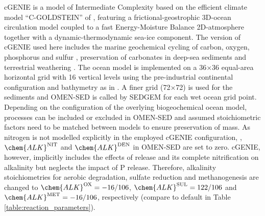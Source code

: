 \documentclass[gmd, manuscript]{copernicus}
\begin{document}
cGENIE is a model of Intermediate Complexity based on the efficient climate model ``C-GOLDSTEIN''  of \citet{edwards_uncertainties_2005}, featuring a frictional-geostrophic 3D-ocean circulation model coupled to a fast 
Energy-Moisture Balance 2D-atmosphere together with a dynamic-thermodynamic sea-ice component. 
The version of cGENIE used here includes the marine geochemical cycling of carbon, oxygen, phosphorus and sulfur \citep{ridgwell_marine_2007}, 
preservation of carbonates in deep-sea sediments \citep[SEDGEM,][]{ridgwell_regulation_2007} and terrestrial weathering \citep{colbourn_rock_2013}. 
The ocean model is implemented on a 36$\times$36 equal-area horizontal grid with 16 vertical levels using the pre-industrial continental configuration and bathymetry as in \citet{archer_atmospheric_2009}. 
A finer grid (72$\times$72) is used for the sediments \citep[see Fig. \ref{fig:TOC_Obs_regridded}C and ][]{ridgwell_regulation_2007} and OMEN-SED is called by SEDGEM for each wet ocean grid point. 
Depending on the configuration of the overlying biogeochemical ocean model, processes can be included or excluded in OMEN-SED and assumed stoichiometric factors need to be matched between models to ensure preservation of mass. 
As nitrogen is not modelled explicitly in the employed cGENIE configuration, , $\chem{ALK}^\mathrm{NIT}$ and $\chem{ALK}^\mathrm{DEN}$ in OMEN-SED are set to zero. 
cGENIE, however, implicitly includes the effects of  release and its complete nitrification on alkalinity but neglects the impact of P release. Therefore, alkalinity 
stoichiometries for aerobic degradation, sulfate reduction and methanogenesis are changed to $\chem{ALK}^\mathrm{OX} = -16/106$, $\chem{ALK}^\mathrm{SUL} = 122/106$ and $\chem{ALK}^\mathrm{MET} = -16/106$, respectively 
(compare to default in Table \ref{table:reaction_parameters}).
\end{document}
